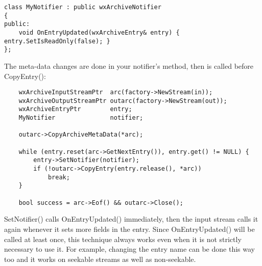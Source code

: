 \begin{verbatim}
class MyNotifier : public wxArchiveNotifier
{
public:
    void OnEntryUpdated(wxArchiveEntry& entry) { entry.SetIsReadOnly(false); }
};

\end{verbatim}

The meta-data changes are done in your notifier's
  method,
then  is called before
CopyEntry():

\begin{verbatim}
    wxArchiveInputStreamPtr  arc(factory->NewStream(in));
    wxArchiveOutputStreamPtr outarc(factory->NewStream(out));
    wxArchiveEntryPtr        entry;
    MyNotifier               notifier;

    outarc->CopyArchiveMetaData(*arc);

    while (entry.reset(arc->GetNextEntry()), entry.get() != NULL) {
        entry->SetNotifier(notifier);
        if (!outarc->CopyEntry(entry.release(), *arc))
            break;
    }

    bool success = arc->Eof() && outarc->Close();

\end{verbatim}

SetNotifier() calls OnEntryUpdated() immediately, then the input
stream calls it again whenever it sets more fields in the entry. Since
OnEntryUpdated() will be called at least once, this technique always
works even when it is not strictly necessary to use it. For example,
changing the entry name can be done this way too and it works on seekable
streams as well as non-seekable.

